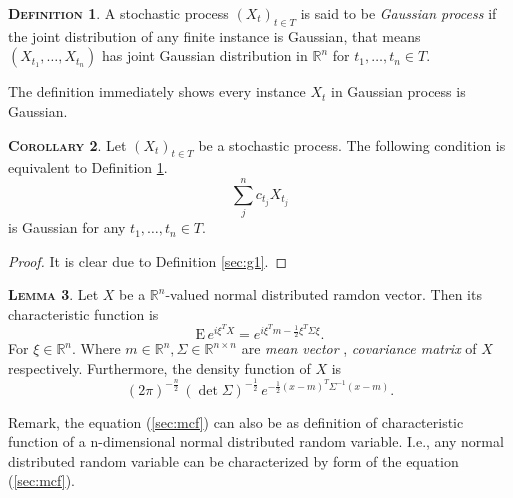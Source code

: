 \documentclass[a4paper, twoside, 11pt]{article}
\theoremstyle{definition}
\newtheorem{definition}{\scshape Definition}[section]
\newtheorem{lemma}[definition]{\scshape Lemma}
\newtheorem{corollary}[definition]{\scshape Corollary}
\begin{document}
\begin{definition}
  A stochastic process $(X_t)_{t\in T}$ is said to be \emph{Gaussian process} if the joint distribution of any finite instance is Gaussian, that means
$
(X_{t_1},\dots, X_{t_n})
$ has joint Gaussian distribution in $\mathbb{R}^n$ for $t_1,\dots,t_n \in T$.
\label{sec:defgau}
\end{definition}
The definition immediately shows every instance $X_t$ in Gaussian process is Gaussian.

\begin{corollary}
  Let $(X_t)_{t\in T}$ be a stochastic process. The following condition is equivalent to Definition \ref{sec:defgau}.
  \begin{equation}
	\sum_j^n c_{t_j} X_{t_j}
  \end{equation}
  is Gaussian for any $t_1,\dots,t_n \in T$.
  \label{sec:gauss}
\end{corollary}
\begin{proof}
  It is clear due to Definition \ref{sec:g1}.
\end{proof}

\begin{lemma}
  Let $X$ be a $\mathbb{R}^{n}$-valued normal distributed ramdon vector. Then its characteristic function is 
  \begin{equation}
	\mathrm{E}\,e^{i\xi^TX} = e^{i\xi^Tm - \frac{1}{2}\xi^T \Sigma \xi}.
	\label{sec:mcf}
  \end{equation}
 For $\xi \in \mathbb{R}^{n}$. Where $m \in \mathbb{R}^{n}, \Sigma \in \mathbb{R}^{n\times n}$ are \emph{mean vector} , \emph{covariance matrix} of $X$ respectively. Furthermore, the density function of $X$ is
\begin{equation}
  (2\pi)^{-\frac{n}{2}}\, (\det\Sigma) ^{-\frac{1}{2}}\,e^{-\frac{1}{2}(x-m)^T\Sigma^{-1}(x-m)}.
  \label{sec:dsy}
\end{equation}
\end{lemma}

Remark, the equation (\ref{sec:mcf}) can also be as definition of characteristic function of a n-dimensional normal distributed random variable. I.e., any normal distributed random variable can be characterized by form of the equation (\ref{sec:mcf}).
\end{document}
